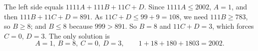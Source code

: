 The left side equals $1111A+111B+11C+D$. Since $1111A\le2002$, $A=1$, and then $111B+11C+D=891$. As $11C+D\le99+9=108$, we need $111B\ge783$, so $B\ge8$; and $B\le8$ because $999>891$. So $B=8$ and $11C+D=3$, which forces $C=0$, $D=3$. The only solution is
\[
\boxed{A=1,\ B=8,\ C=0,\ D=3},\qquad 1+18+180+1803=2002 .
\]

